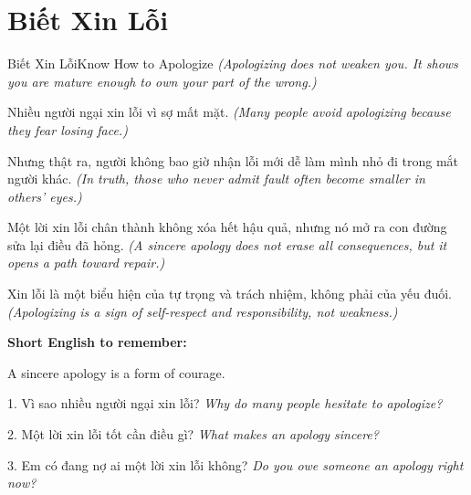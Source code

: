 \section{Biết Xin Lỗi}
\begin{truyen}{Biết Xin Lỗi}{Know How to Apologize}
\textit{(Apologizing does not weaken you. It shows you are mature enough to own your part of the wrong.)}

Nhiều người ngại xin lỗi vì sợ mất mặt.
\textit{(Many people avoid apologizing because they fear losing face.)}

Nhưng thật ra, người không bao giờ nhận lỗi mới dễ làm mình nhỏ đi trong mắt người khác.
\textit{(In truth, those who never admit fault often become smaller in others' eyes.)}

Một lời xin lỗi chân thành không xóa hết hậu quả, nhưng nó mở ra con đường sửa lại điều đã hỏng.
\textit{(A sincere apology does not erase all consequences, but it opens a path toward repair.)}
\end{truyen}

\begin{baihoc}
Xin lỗi là một biểu hiện của tự trọng và trách nhiệm, không phải của yếu đuối.
\textit{(Apologizing is a sign of self-respect and responsibility, not weakness.)}
\end{baihoc}

\begin{ghinhoanh}
\textbf{Short English to remember:}

A sincere apology is a form of courage.

\end{ghinhoanh}

\begin{tuhocnhanh}
1. Vì sao nhiều người ngại xin lỗi? \textit{Why do many people hesitate to apologize?}

2. Một lời xin lỗi tốt cần điều gì? \textit{What makes an apology sincere?}

3. Em có đang nợ ai một lời xin lỗi không? \textit{Do you owe someone an apology right now?}
\end{tuhocnhanh}
\ngancach

